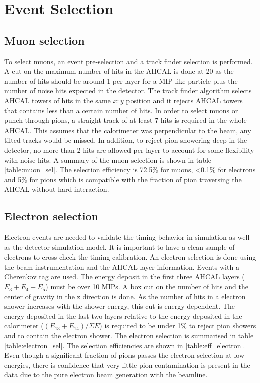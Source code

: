\documentclass{JINST}
\begin{document}
\section{Event Selection}

\subsection{Muon selection}

To select muons, an event pre-selection and a track finder \cite{Hartbrich:2016bbz} selection is performed. A cut on the maximum number of hits in the AHCAL is done at 20 as the number of hits should be around 1 per layer for a MIP-like particle plus the number of noise hits expected in the detector. The track finder algorithm selects AHCAL towers of hits in the same $x:y$ position and it rejects AHCAL towers that contains less than a certain number of hits. In order to select muons or punch-through pions, a straight track of at least 7 hits is required in the whole AHCAL. This assumes that the calorimeter was perpendicular to the beam, any tilted tracks would be missed. In addition, to reject pion showering deep in the detector, no more than 2 hits are allowed per layer to account for some flexibility with noise hits. A summary of the muon selection is shown in table \ref{table:muon_sel}. The selection efficiency is 72.5\% for muons, <0.1\% for electrons and 5\% for pions which is compatible with the fraction of pion traversing the AHCAL without hard interaction.

\subsection{Electron selection}

Electron events are needed to validate the timing behavior in simulation as well as the detector simulation model. It is important to have a clean sample of electrons to cross-check the timing calibration. An electron selection is done using the beam instrumentation and the AHCAL layer information. Events with a Cherenkov tag are used. The energy deposit in the first three AHCAL layers ($E_3+E_4+E_5$) must be over 10 MIPs. A box cut on the number of hits and the center of gravity in the z direction is done. As the number of hits in a electron shower increases with the shower energy, this cut is energy dependent. The energy deposited in the last two layers relative to the energy deposited in the calorimeter ($(E_{13}+E_{14})/\Sigma E$) is required to be under 1\% to reject pion showers and to contain the electron shower. The electron selection is summarised in table \ref{table:electron_sel}. The selection efficiencies are shown in \ref{table:eff_electron}. Even though a significant fraction of pions passes the electron selection at low energies, there is confidence that very little pion contamination is present in the data due to the pure electron beam generation with the beamline.
\end{document}
